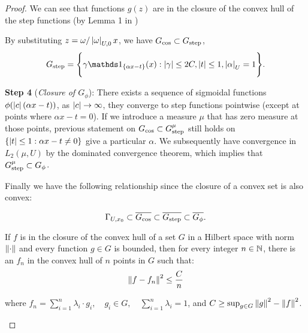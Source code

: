 \begin{proof}
    We can see that functions $g(z)$ are in the closure of the convex hull of
    the step functions (by Lemma 1 in
    \cite{barronUniversalApproximationBounds1993})

    By substituting $z = \omega/\left| \omega \right|_{U, 0} x$, we have $G_{\cos}
    \subset G_{\textnormal{step}}$,
    \begin{equation}
        G_{\textnormal{step}} = \Bigg\{
            \gamma\indicator{\{\alpha x-t\}}(x):
            \abs{\gamma} \leq 2C,
            \abs{t} \leq 1,
            \abs{\alpha}_{U} = 1
        \Bigg\}.
    \end{equation}

    \textbf{Step 4} (\textit{Closure of $G_{\phi}$}): There exists a sequence of
    sigmoidal functions $\phi(\left| c \right|(\alpha x - t))$, as $\left| c \right| \to \infty$,
    they converge to step functions pointwise (except at points where $\alpha x
    - t = 0$). If we introduce a measure $\mu$ that has zero measure at those
    points, previous statement on $G_{\cos} \subset G^{\mu}_{\textnormal{step}}$
    still holds on $\{\left| t \right| \leq 1: \alpha x - t \not=0\}$ give a particular
    $\alpha$. We subsequently have convergence in $L_2(\mu, U)$ by the dominated
    convergence theorem, which implies that $G^{\mu}_{\textnormal{step}} \subset
    G_{\phi}$.

    Finally we have the following relationship since the closure of a convex set
    is also convex:

    \begin{equation*}
        \Gamma_{U, x_0} \subset \overline{G_{\cos}} 
        \subset \overline{G_{\textnormal{step}}} \subset \overline{G_{\phi}}.
    \end{equation*}

    \begin{lemma}
    If $f$ is in the closure of the convex hull of a set $G$ in a Hilbert space
    with norm $\left\| \cdot \right\|$ and every function $g \in G$ is bounded, then for
    every integer $n \in \mathbb{N}$, there is an $f_n$ in the convex hull of $n$
    points in $G$ such that:
    \begin{equation}
        \left\| f - f_n \right\|^2 \leq \frac{C}{n}
    \end{equation}

    where $f_n = \sum_{i=1}^n \lambda_i \cdot g_i, \quad g_i \in G, \quad
    \sum_{i=1}^n \lambda_i = 1$, and $C \geq \sup_{g\in G} \left\| g \right\|^2 -
    \left\| f \right\|^2$.


\end{lemma}
\end{proof}
